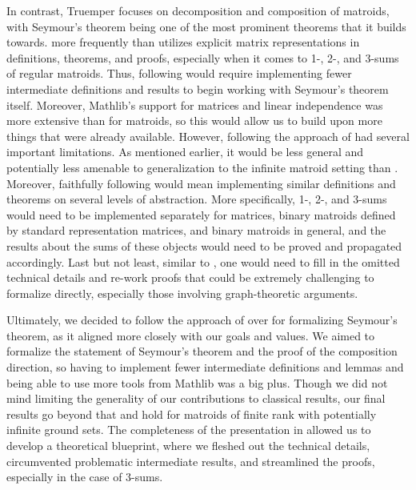 In contrast, Truemper \cite{Truemper2016} focuses on decomposition and composition of matroids, with Seymour's theorem being one of the most prominent theorems that it builds towards. \citeauthor{Truemper2016} \cite{Truemper2016} more frequently than \citeauthor{Oxley2011} \cite{Oxley2011} utilizes explicit matrix representations in definitions, theorems, and proofs, especially when it comes to 1-, 2-, and 3-sums of regular matroids. Thus, following \cite{Truemper2016} would require implementing fewer intermediate definitions and results to begin working with Seymour's theorem itself. Moreover, Mathlib's support for matrices and linear independence was more extensive than for matroids, so this would allow us to build upon more things that were already available. However, following the approach of \cite{Truemper2016} had several important limitations. As mentioned earlier, it would be less general and potentially less amenable to generalization to the infinite matroid setting than \cite{Oxley2011}. Moreover, faithfully following \cite{Truemper2016} would mean implementing similar definitions and theorems on several levels of abstraction. More specifically, 1-, 2-, and 3-sums would need to be implemented separately for matrices, binary matroids defined by standard representation matrices, and binary matroids in general, and the results about the sums of these objects would need to be proved and propagated accordingly. Last but not least, similar to \cite{Oxley2011}, one would need to fill in the omitted technical details and re-work proofs that could be extremely challenging to formalize directly, especially those involving graph-theoretic arguments.

Ultimately, we decided to follow the approach of \cite{Truemper2016} over \cite{Oxley2011} for formalizing Seymour's theorem, as it aligned more closely with our goals and values. We aimed to formalize the statement of Seymour's theorem and the proof of the composition direction, so having to implement fewer intermediate definitions and lemmas and being able to use more tools from Mathlib was a big plus. Though we did not mind limiting the generality of our contributions to classical results, our final results go beyond that and hold for matroids of finite rank with potentially infinite ground sets. The completeness of the presentation in \cite{Truemper2016} allowed us to develop a theoretical blueprint, where we fleshed out the technical details, circumvented problematic intermediate results, and streamlined the proofs, especially in the case of 3-sums. %

